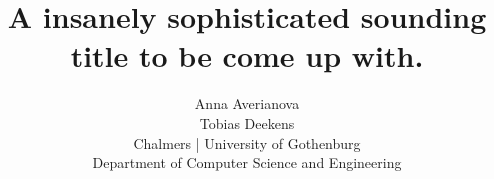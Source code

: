 \documentclass[times, 10pt,twocolumn]{article}
\begin{document}
	\title{A insanely sophisticated sounding title to be come up with.}

	\author{Anna Averianova\\
		Tobias Deekens\\
		Chalmers | University of Gothenburg\\
		Department of Computer Science and Engineering\\
	}

	\maketitle
	\thispagestyle{empty}

	\begin{comment}
		Agile Software Development rooted in the need to adjust and respond to change quicker to deliver higher business value. Most Agile development processes are geared towards being applied within small, loosely coupled teams all working mostly independent. The promises promoted by Agile’s advocates remain appealing to large scale organizations such as Ericsson. Yet not all benefits might be put into effect possibly due to an intertwined organizational structure.
	   Ericsson moved from a matrix-like organisational structure towards a hierarchical one with Cross-Functional-Teams at its lower level trying to embrace Agile Software Development: a structure not necessarily prescribed by Agile but motivated by Ericsson’s scale. As performance fluctuations and discrepancies became visible over the course of the transformation, it seems boundaries and connection within the structure may hinder taking full advantage of Agile Software Development.
	   A thesis’ aim is to investigate possible issues with Agile at scale, flow and blockages within Ericsson’s organizational structure and the creation of fruitful environments fostering self-management and productivity. A more concrete research scope will be determined while decisions upon methods will be made in accordance with the final scope. These could include interviewing, surveying, observations, access to software repositories or other existing relevant data.
	\end{comment}


	\begin{comment}
	  - Cover a bit of it all without crazy detail... (listed in template too)
	  - Leave Ericsson mostly out for now, they're just the subject to investigation not main objective
	  		- Do not mention research design yet
	  - Introduce field of research (just a line or two): Agile its roots and industry acceptance
	  - Reasoned by hitch of small scale development methodologies in large scale corporations
	  - Research context by mentioning Agile at scale with transformation by big firms
	  - Narrow the scope towards organizational structures
	\end{comment}
\end{document}
